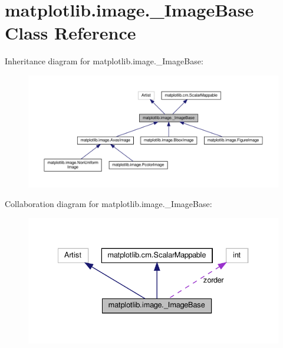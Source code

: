 \hypertarget{classmatplotlib_1_1image_1_1__ImageBase}{}\section{matplotlib.\+image.\+\_\+\+Image\+Base Class Reference}
\label{classmatplotlib_1_1image_1_1__ImageBase}


Inheritance diagram for matplotlib.\+image.\+\_\+\+Image\+Base\+:
\nopagebreak
\begin{figure}[H]
\begin{center}
\leavevmode
\includegraphics[width=350pt]{classmatplotlib_1_1image_1_1__ImageBase__inherit__graph}
\end{center}
\end{figure}


Collaboration diagram for matplotlib.\+image.\+\_\+\+Image\+Base\+:
\nopagebreak
\begin{figure}[H]
\begin{center}
\leavevmode
\includegraphics[width=334pt]{classmatplotlib_1_1image_1_1__ImageBase__coll__graph}
\end{center}
\end{figure}
